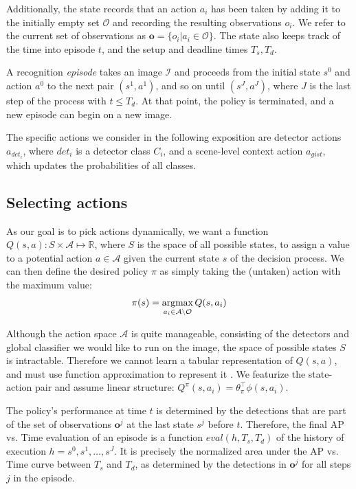 Additionally, the state records that an action $a_i$ has been taken by adding it to the initially empty set $\mathcal{O}$ and recording the resulting observations $o_i$.
We refer to the current set of observations as $\mathbf{o} = \{o_i | a_i \in \mathcal{O}\}$.
The state also keeps track of the time into episode $t$, and the setup and deadline times $T_s,T_d$.

A recognition \emph{episode} takes an image $\mathcal{I}$ and proceeds from the initial state $s^0$ and action $a^0$ to the next pair $(s^1,a^1)$, and so on until $(s^J,a^J)$, where $J$ is the last step of the process with $t \le T_d$.
At that point, the policy is terminated, and a new episode can begin on a new image.

The specific actions we consider in the following exposition are detector actions $a_{{det}_i}$, where ${det}_i$ is a detector class $C_i$, and a scene-level context action $a_{gist}$, which updates the probabilities of all classes.

\subsection{Selecting actions} \label{sec:value}
As our goal is to pick actions dynamically, we want a function $Q(s,a): S \times \mathcal{A} \mapsto \mathbb{R}$, where $S$ is the space of all possible states, to assign a value to a potential action $a \in \mathcal{A}$ given the current state $s$ of the decision process.
We can then define the desired policy $\pi$ as simply taking the (untaken) action with the maximum value:
\begin{align}
\pi(s) = \argmax_{a_i \in \mathcal{A} \setminus \mathcal{O}} Q(s,a_i)
\end{align}

Although the action space $\mathcal{A}$ is quite manageable, consisting of the detectors and global classifier we would like to run on the image, the space of possible states $S$ is intractable.
Therefore we cannot learn a tabular representation of $Q(s,a)$, and must use function approximation to represent it \cite{Sutton1998}.
We featurize the state-action pair and assume linear structure: $Q^\pi(s,a_i) = \theta_\pi^\top  \phi(s,a_i)$.

The policy's performance at time $t$ is determined by the detections that are part of the set of observations $\mathbf{o}^j$ at the last state $s^j$ before $t$.
Therefore, the final AP vs. Time evaluation of an episode is a function $eval(h,T_s,T_d)$ of the history of execution $h=s^0,s^1,\dots,s^J$.
It is precisely the normalized area under the AP vs. Time curve between $T_s$ and $T_d$, as determined by the detections in $\mathbf{o}^j$ for all steps $j$ in the episode.

